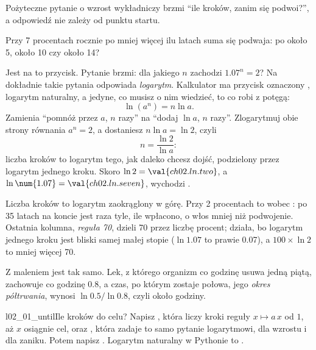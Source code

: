 \noindent
Pożyteczne pytanie o wzrost wykładniczy brzmi \enquote{ile kroków, zanim
się podwoi?}, a odpowiedź nie zależy od punktu startu.

\begin{think}
Przy 7 procentach rocznie po mniej więcej ilu latach suma się podwaja: po
około 5, około 10 czy około 14?
\end{think}
Jest na to przycisk. Pytanie brzmi: dla jakiego $n$ zachodzi
$\num{1.07}^n = 2$? Na dokładnie takie pytania odpowiada \emph{logarytm}.
Kalkulator ma przycisk oznaczony , logarytm naturalny, a jedyne,
co musisz o nim wiedzieć, to co robi z potęgą:
\[ \ln (a^n) = n \ln a . \]
Zamienia \enquote{pomnóż przez $a$, $n$ razy} na \enquote{dodaj $\ln a$, $n$
razy}. Zlogarytmuj obie strony równania $a^n = 2$, a dostaniesz
$n \ln a = \ln 2$, czyli
\[ n = \frac{\ln 2}{\ln a} : \]
liczba kroków to logarytm tego, jak daleko chcesz dojść, podzielony przez
logarytm jednego kroku. Skoro $\ln 2 = \val{ch02.ln.two}$, a
$\ln \num{1.07} = \val{ch02.ln.seven}$, wychodzi .



\noindent
Liczba kroków to logarytm zaokrąglony w górę. Przy 2 procentach to
 wobec : po 35 latach na
koncie jest  raza tyle, ile wpłacono, o włos mniej
niż podwojenie. Ostatnia kolumna, \emph{reguła 70}, dzieli 70 przez liczbę
procent; działa, bo logarytm jednego kroku jest bliski samej małej stopie
($\ln \num{1.07}$ to prawie \num{0.07}), a $100 \times \ln 2$ to mniej
więcej 70.

Z maleniem jest tak samo. Lek, z którego organizm co godzinę usuwa jedną
piątą, zachowuje co godzinę \num{0.8}, a czas, po którym zostaje połowa,
jego \emph{okres półtrwania}, wynosi $\ln \num{0.5} / \ln \num{0.8}$, czyli
około  godziny.

\begin{lab}{l02_01_until}{Ile kroków do celu?}
Napisz , która liczy kroki reguły $x \mapsto a\,x$ od
$1$, aż $x$ osiągnie cel, oraz , która zadaje to samo
pytanie logarytmowi, dla wzrostu i dla zaniku. Potem napisz
. Logarytm naturalny w Pythonie to .
\end{lab}

